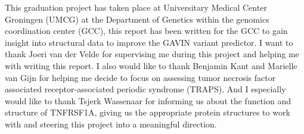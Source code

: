 This graduation project has taken place at Universitary Medical Center Groningen (UMCG) at the Department of Genetics within the genomics coordination center (GCC), this report has been written for the GCC to gain insight into structural data to improve the GAVIN variant predictor. I want to thank Joeri van der Velde for supervising me during this project and helping me with writing this report. I also would like to thank Benjamin Kant and Marielle van Gijn for helping me decide to focus on assessing tumor necrosis factor associated receptor-associated periodic syndrome (TRAPS). And I especially would like to thank Tsjerk Wassenaar for informing us about the function and structure of TNFRSF1A, giving us the appropriate protein structures to work with and steering this project into a meaningful direction.